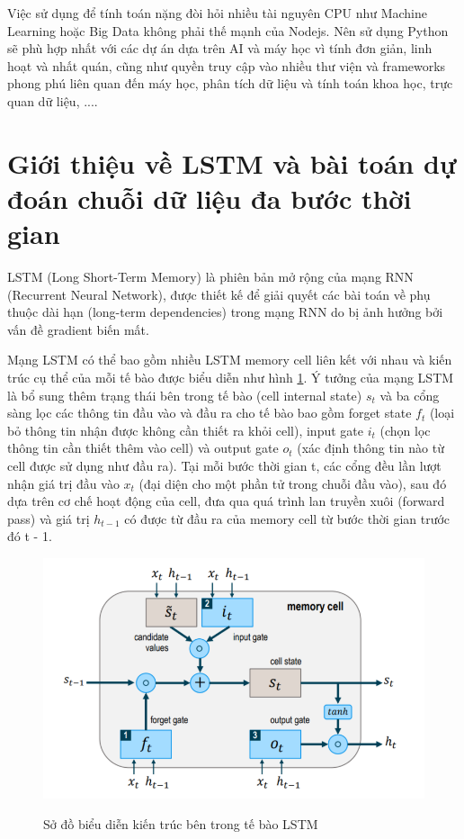 Việc sử dụng để tính toán nặng đòi hỏi nhiều tài nguyên CPU như Machine Learning hoặc Big Data không phải thế mạnh của Nodejs. Nên sử dụng Python sẽ phù hợp nhất với các dự án dựa trên AI và máy học vì tính đơn giản, linh hoạt và nhất quán, cũng như quyền truy cập vào nhiều thư viện và frameworks phong phú liên quan đến máy học, phân tích dữ liệu và tính toán khoa học, trực quan dữ liệu, ....

\section{Giới thiệu về LSTM và bài toán dự đoán chuỗi dữ liệu đa bước thời gian}
LSTM (Long Short-Term Memory) là phiên bản mở rộng của mạng RNN (Recurrent Neural Network), được thiết kế để giải quyết các bài toán về phụ thuộc dài hạn (long-term dependencies) trong mạng RNN do bị ảnh hưởng bởi vấn đề gradient biến mất.

Mạng LSTM có thể bao gồm nhiều LSTM memory cell liên kết với nhau và kiến trúc cụ thể của mỗi tế bào được biểu diễn như hình \ref{tab.lstm_cell}. Ý tưởng của mạng LSTM là bổ sung thêm trạng thái bên trong tế bào (cell internal state) $s_t$ và ba cổng sàng lọc các thông tin đầu vào và đầu ra cho tế bào bao gồm forget state $f_t$ (loại bỏ thông tin nhận được không cần thiết ra khỏi cell), input gate $i_t$ (chọn lọc thông tin cần thiết thêm vào cell) và output gate $o_t$ (xác định thông tin nào từ cell được sử dụng như đầu ra). Tại mỗi bước thời gian t, các cổng đều lần lượt nhận giá trị đầu vào $x_t$ (đại diện cho một phần tử trong chuỗi đầu vào), sau đó dựa trên cơ chế hoạt động của cell, đưa qua quá trình lan truyền xuôi (forward pass) và giá trị $h_{t-1}$ có được từ đầu ra của memory cell từ bước thời gian trước đó t - 1.

\begin{figure}[h]
    \caption{Sở đồ biểu diễn kiến trúc bên trong tế bào LSTM}
    \includegraphics[width=\textwidth]{images/Khanh/Python/LSTM_cell_structure.PNG}
    \label{tab.lstm_cell}
\end{figure}

